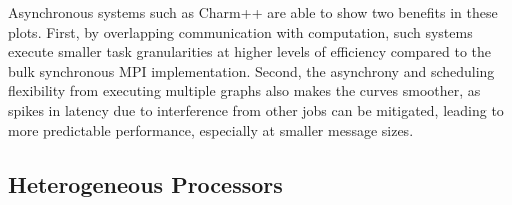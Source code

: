 Asynchronous systems such as Charm++ are able to show two benefits in
these plots. First, by overlapping communication with computation,
such systems execute smaller task granularities at higher
levels of efficiency compared to the bulk synchronous MPI
implementation. Second, the asynchrony and scheduling flexibility from
executing multiple graphs also makes the curves smoother,
as spikes in latency due to interference from other jobs can be
mitigated, leading to more predictable performance, especially at
smaller message sizes.

\subsection{Heterogeneous Processors}



